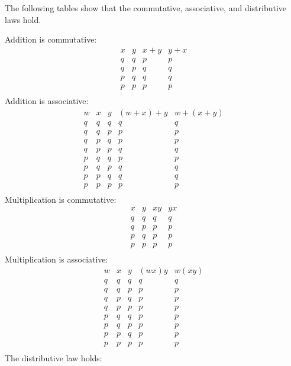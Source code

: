 \begin{solution}
The following tables show that the commutative, associative, and distributive laws hold.

Addition is commutative:
\[
\begin{array}{cccc}
    x & y & x+y & y+x\\
    \hline
    q & q & p & p\\
    q & p & q & q\\
    p & q & q & q\\
    p & p & p & p\\
\end{array}
\]
Addition is associative:
\[
\begin{array}{ccccc}
    w & x & y & (w+x)+y & w+(x+y)\\
    \hline
    q & q & q & q & q\\
    q & q & p & p & p\\
    q & p & q & p & p\\
    q & p & p & q & q\\
    p & q & q & p & p\\
    p & q & p & q & q\\
    p & p & q & q & q\\
    p & p & p & p & p\\
\end{array}
\]
Multiplication is commutative:
\[
\begin{array}{cccc}
    x & y & xy & yx\\
    \hline
    q & q & q & q\\
    q & p & p & p\\
    p & q & p & p\\
    p & p & p & p\\
\end{array}
\]
Multiplication is associative:
\[
\begin{array}{ccccc}
    w & x & y & (wx)y & w(xy)\\
    \hline
    q & q & q & q & q\\
    q & q & p & p & p\\
    q & p & q & p & p\\
    q & p & p & p & p\\
    p & q & q & p & p\\
    p & q & p & p & p\\
    p & p & q & p & p\\
    p & p & p & p & p\\
\end{array}
\]
The distributive law holds:

\end{solution}
